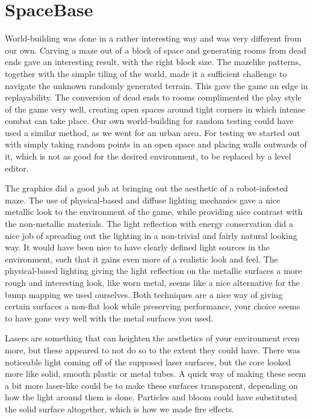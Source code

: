 \section{SpaceBase}
World-building was done in a rather interesting way and was very different from our own. Carving a maze out of a block of space and generating rooms from dead ends gave an interesting result, with the right block size. The mazelike patterns, together with the simple tiling of the world, made it a sufficient challenge to navigate the unknown randomly generated terrain. This gave the game an edge in replayability. The conversion of dead ends to rooms complimented the play style of the game very well, creating open spaces around tight corners in which intense combat can take place. Our own world-building for random testing could have used a similar method, as we went for an urban area. For testing we started out with simply taking random points in an open space and placing walls outwards of it, which is not as good for the desired environment, to be replaced by a level editor.

The graphics did a good job at bringing out the aesthetic of a robot-infested maze. The use of physical-based and diffuse lighting mechanics gave a nice metallic look to the environment of the game, while providing nice contrast with the non-metallic materials. The light reflection with energy conservation did a nice job of spreading out the lighting in a non-trivial and fairly natural looking way. It would have been nice to have clearly defined light sources in the environment, such that it gains even more of a realistic look and feel. The physical-based lighting giving the light reflection on the metallic surfaces a more rough and interesting look, like worn metal, seems like a nice alternative for the bump mapping we used ourselves. Both techniques are a nice way of giving certain surfaces a non-flat look while preserving performance, your choice seems to have gone very well with the metal surfaces you used.

Lasers are something that can heighten the aesthetics of your environment even more, but these appeared to not do so to the extent they could have. There was noticeable light coming off of the supposed laser surfaces, but the core looked more like solid, smooth plastic or metal tubes. A quick way of making these seem a bit more laser-like could be to make these surfaces transparent, depending on how the light around them is done. Particles and bloom could have substituted the solid surface altogether, which is how we made fire effects.

